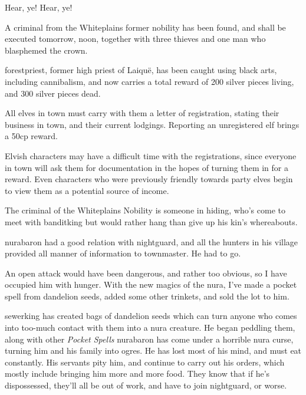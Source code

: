 \begin{multicols}{2}
\begin{speechtext}

  Hear, ye! Hear, ye!

  A criminal from the Whiteplains former nobility has been found, and shall be executed tomorrow, noon, together with three thieves and one man who blasphemed the crown.

  \Gls{forestpriest}, former high priest of Laiqu\"{e}, has been caught using black arts, including cannibalism, and now carries a total reward of 200 silver pieces living, and 300 silver pieces dead.

  All elves in \gls{town} must carry with them a letter of registration, stating their business in town, and their current lodgings.
  Reporting an unregistered elf brings a 50cp reward.

\end{speechtext}

Elvish characters may have a difficult time with the registrations, since everyone in \gls{town} will ask them for documentation in the hopes of turning them in for a reward.
Even characters who were previously friendly towards party elves begin to view them as a potential source of income.

The criminal of the Whiteplains Nobility is someone in hiding, who's come to meet with \gls{banditking} but would rather hang than give up his kin's whereabouts.

\stopcontents[sq]

\resumecontents[Town]

\label{desperatemeasures}

\stopcontents[Town]

\startcontents[sq]

\sqminitoc

\begin{speechtext}

  \Gls{nurabaron} had a good relation with \gls{nightguard}, and all the hunters in his village provided all manner of information to \gls{townmaster}.
  He had to go.

  An open attack would have been dangerous, and rather too obvious, so I have occupied him with hunger.
  With the new magics of the nura, I've made a pocket spell from dandelion seeds, added some other trinkets, and sold the lot to him.

\end{speechtext}

\noindent
\Gls{sewerking} has created bags of dandelion seeds which can turn anyone who comes into too-much contact with them into a nura creature.
He began peddling them, along with other \textit{Pocket Spells}%
\iftoggle{core}{\footnote{See the core book, page \pageref{pocketSpell}.}}{}
\gls{nurabaron} has come under a horrible nura curse, turning him and his family into ogres.
He has lost most of his mind, and must eat constantly.
His servants pity him, and continue to carry out his orders, which mostly include bringing him more and more food.
They know that if he's dispossessed, they'll all be out of work, and have to join \gls{nightguard}, or worse.


\end{multicols}
